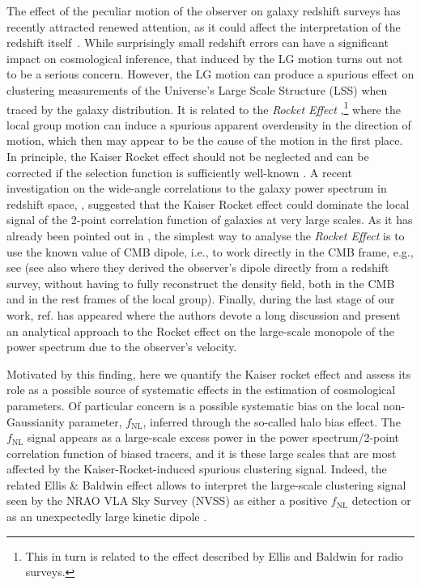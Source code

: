 \documentclass[a4paper,11pt]{article}
\begin{document}
The effect of the peculiar motion of the observer on galaxy redshift surveys has recently attracted renewed attention, as it could affect the interpretation of the redshift itself~\cite{Davis:1907.12639, Glanville2011.04210}. While surprisingly small redshift errors can have a significant impact on cosmological inference, that induced by the LG motion turns out not to be a serious concern. However, the LG motion can produce a spurious effect on clustering measurements of the Universe's  Large Scale Structure (LSS) when traced by the galaxy distribution. It is related to the  {\it Rocket Effect}  \cite{Kaiser:1987qv},\footnote{This in turn is related to the effect described by Ellis and Baldwin \cite{Ellis:1984} for radio surveys.} where the local group motion can induce a spurious apparent overdensity in the direction of motion, which then may appear to be the cause of the motion in the first place.
In principle, the Kaiser Rocket effect should not be neglected \cite{Nusser:2014sha} and can be  corrected if the selection function is
sufficiently well-known \cite{Strauss:1995fz}. 
A recent investigation on the wide-angle correlations to the galaxy power spectrum in redshift space, \cite{Bertacca:2019wyg}, suggested that the Kaiser Rocket effect could dominate the local signal of the 2-point correlation function of galaxies at very large scales.
As it has already been pointed out in \cite{Hamilton:1995px}, the simplest way to analyse the {\it Rocket Effect} is to use the known value of  CMB dipole, i.e., to work directly in the CMB frame, e.g., see \cite{Yousuke2010}
(see also \cite{Taylor:1999ah} where they derived the observer's dipole directly from a redshift survey, without having to fully reconstruct the density field, both in the CMB and in the rest frames of the local group).
Finally, during the  last stage of our work,  ref. \cite{Castorina:2021xzs}  has appeared where the authors devote a long discussion and present  an analytical approach to the Rocket effect on the large-scale  monopole of the power spectrum due to the observer's velocity.

Motivated by this finding, here we quantify the Kaiser rocket effect and assess its role as a possible source of systematic effects in the estimation of cosmological parameters. Of particular concern is a possible systematic bias on the local non-Gaussianity parameter, $f_\mathrm{NL}$, inferred through the so-called halo bias effect. The $f_\mathrm{NL}$ signal appears as a large-scale excess power in the power spectrum/2-point correlation function of biased tracers, and it is these large scales that are most affected by the Kaiser-Rocket-induced spurious clustering signal. Indeed, the related Ellis \& Baldwin effect \cite{Ellis:1984} allows to interpret the large-scale clustering signal seen by the NRAO VLA Sky Survey (NVSS) as either a positive $f_\mathrm{NL}$ detection \cite{Xia:2010pe} or as an unexpectedly large kinetic dipole \cite{Chen:2015wga}.
\end{document}
